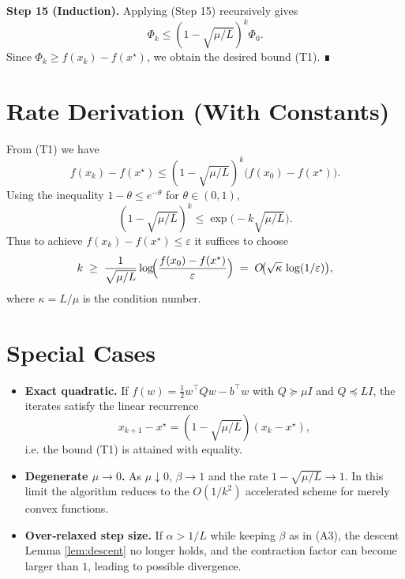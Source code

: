 \documentclass{article}
\begin{document}
\noindent\textbf{Step 15 (Induction).}
Applying (Step 15) recursively gives
\[
\Phi_k \le (1-\sqrt{\mu/L})^{k}\Phi_0 .
\]
Since $\Phi_k\ge f(x_k)-f(x^\star)$, we obtain the desired bound (T1). ∎

\section*{Rate Derivation (With Constants)}
From (T1) we have
\[
f(x_k)-f(x^\star) \le (1-\sqrt{\mu/L})^{k}\bigl(f(x_0)-f(x^\star)\bigr).
\]
Using the inequality $1-\theta \le e^{-\theta}$ for $\theta\in(0,1)$,
\[
(1-\sqrt{\mu/L})^{k}\le \exp\!\bigl(-k\sqrt{\mu/L}\bigr).
\]
Thus to achieve $f(x_k)-f(x^\star)\le \varepsilon$ it suffices to choose
\[
k \;\ge\; \frac{1}{\sqrt{\mu/L}}\log\!\Bigl(\frac{f(x_0)-f(x^\star)}{\varepsilon}\Bigr)
      \;=\; O\!\bigl(\sqrt{\kappa}\,\log(1/\varepsilon)\bigr),
\]
where $\kappa=L/\mu$ is the condition number.

\section*{Special Cases}
\begin{itemize}
    \item \textbf{Exact quadratic.} If $f(w)=\frac{1}{2}w^{\top}Qw-b^{\top}w$ with $Q\succeq \mu I$ and $Q\preceq L I$, the iterates satisfy the linear recurrence
    \[
    x_{k+1}-x^\star = (1-\sqrt{\mu/L})(x_k-x^\star) ,
    \]
    i.e. the bound (T1) is attained with equality.
    \item \textbf{Degenerate $\mu\to0$.} As $\mu\downarrow0$, $\beta\to1$ and the rate $1-\sqrt{\mu/L}\to1$. In this limit the algorithm reduces to the $O(1/k^2)$ accelerated scheme for merely convex functions.
    \item \textbf{Over‑relaxed step size.} If $\alpha>1/L$ while keeping $\beta$ as in (A3), the descent Lemma \ref{lem:descent} no longer holds, and the contraction factor can become larger than $1$, leading to possible divergence.
\end{itemize}
\end{document}

